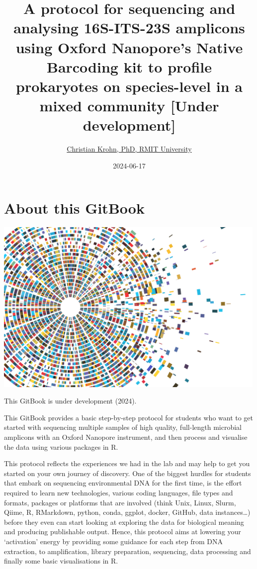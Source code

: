 \documentclass[
]{book}
\title{A protocol for sequencing and analysing 16S-ITS-23S amplicons using Oxford Nanopore's Native Barcoding kit to profile prokaryotes on species-level in a mixed community {[}Under development{]}}
\author{\href{https://www.rmit.edu.au/contact/staff-contacts/academic-staff/k/krohn---christian}{Christian Krohn, PhD, RMIT University}}
\date{2024-06-17}
\begin{document}
\maketitle

{
\setcounter{tocdepth}{1}
\tableofcontents
}
\chapter{About this GitBook}\label{about}

\includegraphics[width=5.20833in,height=\textheight]{./img/vectorstock_23650232.jpg}

This GitBook is under development (2024).

This GitBook provides a basic step-by-step protocol for students who want to get started with sequencing multiple samples of high quality, full-length microbial amplicons with an Oxford Nanopore instrument, and then process and visualise the data using various packages in R.

This protocol reflects the experiences we had in the lab and may help to get you started on your own journey of discovery. One of the biggest hurdles for students that embark on sequencing environmental DNA for the first time, is the effort required to learn new technologies, various coding languages, file types and formats, packages or platforms that are involved (think Unix, Linux, Slurm, Qiime, R, RMarkdown, python, conda, ggplot, docker, GitHub, data instances\ldots) before they even can start looking at exploring the data for biological meaning and producing publishable output. Hence, this protocol aims at lowering your `activation' energy by providing some guidance for each step from DNA extraction, to amplification, library preparation, sequencing, data processing and finally some basic visualisations in R.
\end{document}
